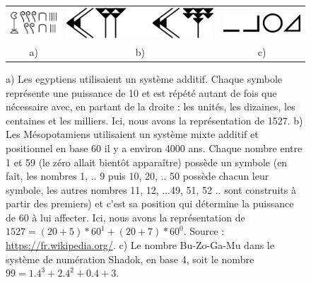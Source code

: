 \begin{figure}[htbp]
\begin{tabular}{ccc}
\includegraphics[width=0.25\linewidth]{Figs/Egypte/1527.pdf}&
\includegraphics[width=0.45\linewidth]{Figs/Mesopotamie/1527.pdf}&
\includegraphics[width=0.25\linewidth]{Figs/Shadock/dessin.pdf}\\
a) & b) & c)
\end{tabular}
\caption{\label{fig:numeration}a) Les egyptiens utilisaient un système additif. Chaque symbole représente une puissance de 10 et est répété autant de fois que nécessaire avec, en partant de la droite : les unités, les dizaines, les centaines et les milliers. Ici, nous avons la représentation de 1527. b) Les Mésopotamiens utilisaient un système mixte additif et positionnel en base 60 il y a environ 4000 ans. Chaque nombre entre 1 et 59 (le zéro allait bientôt apparaître) possède un symbole (en fait, les nombres 1, .. 9 puis 10, 20, .. 50 possède chacun leur symbole, les autres nombres 11, 12, ...49, 51, 52 .. sont construits à partir des premiers) et c'est sa position qui détermine la puissance de 60 à lui affecter. Ici, nous avons la représentation de $1527 = (20 + 5) * 60^1 + (20 + 7) * 60^0$. Source : \protect\url{https://fr.wikipedia.org/}. c) Le nombre Bu-Zo-Ga-Mu dans le système de numération Shadok, en base 4, soit le nombre $99 = 1.4^3 + 2.4^2 + 0.4 + 3$.}
\end{figure}

